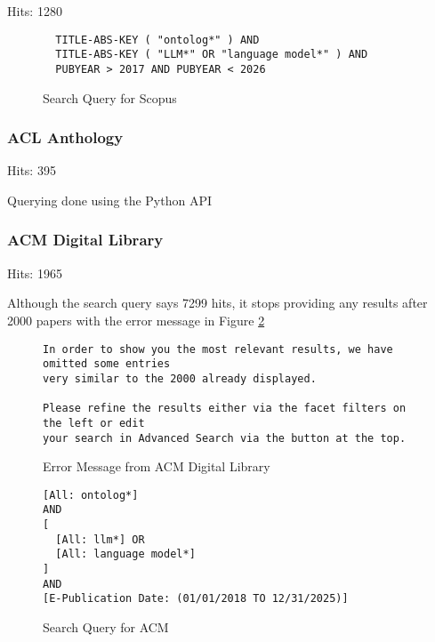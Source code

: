 \documentclass[a4paper,colorinlistoftodos]{article}
\begin{document}
Hits: 1280 \newline

\begin{figure}[H]
\begin{lstlisting}
  TITLE-ABS-KEY ( "ontolog*" ) AND
  TITLE-ABS-KEY ( "LLM*" OR "language model*" ) AND
  PUBYEAR > 2017 AND PUBYEAR < 2026
\end{lstlisting}
  \label{fig:scopus-query}
  \caption{Search Query for Scopus}
\end{figure}

\subsubsection{ACL Anthology}
\label{subsubsec:acl}

Hits: 395 \newline

Querying done using the Python API

\subsubsection{ACM Digital Library}
\label{subsubsec:acm}

Hits: 1965

Although the search query says 7299 hits, it stops providing any results after
2000 papers with the error message in Figure
\ref{fig:acm-search-limit-error-message} 

\begin{figure}[H]
\begin{lstlisting}
In order to show you the most relevant results, we have omitted some entries
very similar to the 2000 already displayed.

Please refine the results either via the facet filters on the left or edit
your search in Advanced Search via the button at the top.
\end{lstlisting}
  \caption{Error Message from ACM Digital Library}
  \label{fig:acm-search-limit-error-message}
\end{figure}

\begin{figure}[H]
\begin{lstlisting}
[All: ontolog*]
AND
[
  [All: llm*] OR
  [All: language model*]
]
AND
[E-Publication Date: (01/01/2018 TO 12/31/2025)]
\end{lstlisting}
  \label{fig:acm-query}
  \caption{Search Query for ACM}
\end{figure}
\end{document}

